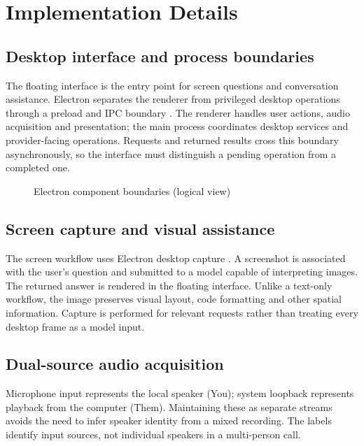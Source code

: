 \documentclass[openany]{tietreport}
\begin{document}
\section{Implementation Details}
\subsection{Desktop interface and process boundaries}
The floating interface is the entry point for screen questions and conversation assistance. Electron separates the renderer from privileged desktop operations through a preload and IPC boundary \cite{electron,ipc}. The renderer handles user actions, audio acquisition and presentation; the main process coordinates desktop services and provider-facing operations. Requests and returned results cross this boundary asynchronously, so the interface must distinguish a pending operation from a completed one.
\begin{figure}[htbp]\centering
{}\caption{Electron component boundaries (logical view)}\end{figure}
\subsection{Screen capture and visual assistance}
The screen workflow uses Electron desktop capture \cite{capture}. A screenshot is associated with the user's question and submitted to a model capable of interpreting images. The returned answer is rendered in the floating interface. Unlike a text-only workflow, the image preserves visual layout, code formatting and other spatial information. Capture is performed for relevant requests rather than treating every desktop frame as a model input.
\subsection{Dual-source audio acquisition}
Microphone input represents the local speaker (You); system loopback represents playback from the computer (Them). Maintaining these as separate streams avoids the need to infer speaker identity from a mixed recording. The labels identify input sources, not individual speakers in a multi-person call.
\end{document}
